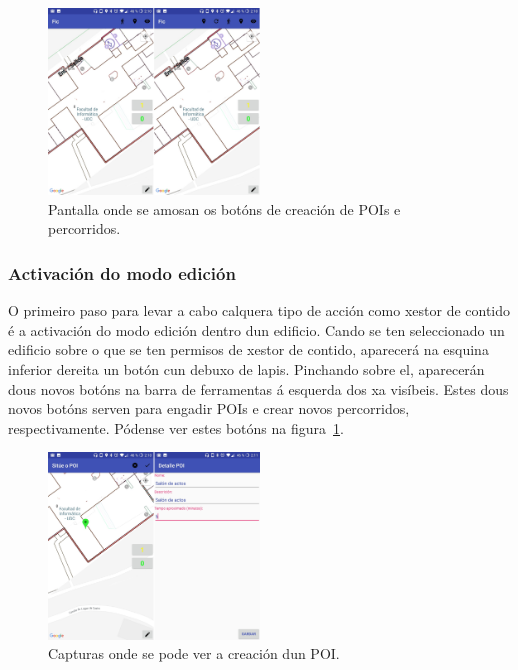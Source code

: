 \begin{figure}[h]
	\begin{center}
		\includegraphics[width=0.5\textwidth]{figures/android/mapaXestorEdicion}
		\caption{Pantalla onde se amosan os botóns de creación de POIs e percorridos.}
		\label{fig:mapaXestorEdicion}
	\end{center}
\end{figure}

\subsubsection{Activación do modo edición}
O primeiro paso para levar a cabo calquera tipo de acción como xestor de contido é a activación do modo edición dentro dun edificio. Cando se ten seleccionado un edificio sobre o que se ten permisos de xestor de contido, aparecerá na esquina inferior dereita un botón cun debuxo de lapis. Pinchando sobre el, aparecerán dous novos botóns na barra de ferramentas á esquerda dos xa visíbeis. Estes dous novos botóns serven para engadir POIs e crear novos percorridos, respectivamente. Pódense ver estes botóns na figura~\ref{fig:mapaXestorEdicion}.

\begin{figure}[h]
	\begin{center}
		\includegraphics[width=0.5\textwidth]{figures/android/mapaCrearPoi}
		\caption{Capturas onde se pode ver a creación dun POI.}
		\label{fig:mapaCrearPoi}
	\end{center}
\end{figure}

